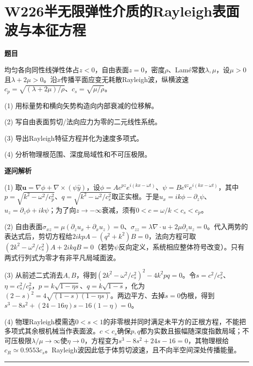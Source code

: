 \documentclass[UTF8,a4paper,11pt,oneside,openany]{ctexbook}
\begin{document}
\section*{W226\quad 半无限弹性介质的Rayleigh表面波与本征方程}
\textbf{题目}\par
均匀各向同性线弹性体占$z<0$，自由表面$z=0$，密度$\rho$、Lamé常数$\lambda,\mu$，设$\mu>0$且$\lambda+2\mu>0$。沿$x$传播平面应变无耗散Rayleigh波，纵横波速$c_p=\sqrt{(\lambda+2\mu)/\rho}$、$c_s=\sqrt{\mu/\rho}$。
\par\smallskip\noindent (1) 用标量势和横向矢势构造向内部衰减的位移解。
\par\smallskip\noindent (2) 写自由表面剪切/法向应力为零的二元线性系统。
\par\smallskip\noindent (3) 导出Rayleigh特征方程并化为速度多项式。
\par\smallskip\noindent (4) 分析物理根范围、深度局域性和不可压极限。
\par\medskip\textbf{逐问解析}\par
\par\smallskip\noindent (1) 取$\boldsymbol u=\nabla\phi+\nabla\times(\psi\hat y)$，设$\phi=Ae^{pz}e^{i(kx-\omega t)}$、$\psi=Be^{qz}e^{i(kx-\omega t)}$，其中$p=\sqrt{k^2-\omega^2/c_p^2}$、$q=\sqrt{k^2-\omega^2/c_s^2}$取正实根。于是$u_x=ik\phi-\partial_z\psi$、$u_z=\partial_z\phi+ik\psi$；为了向$z\to-\infty$衰减，须有$0<c=\omega/k<c_s<c_p$。
\par\smallskip\noindent (2) 自由表面$\sigma_{xz}=\mu(\partial_zu_x+\partial_xu_z)=0$、$\sigma_{zz}=\lambda\nabla\cdot u+2\mu\partial_zu_z=0$。代入两势的表达式后，剪切方程给$2ikpA-(q^2+k^2)B=0$，法向方程可取$(2k^2-\omega^2/c_s^2)A+2ikqB=0$（若势$\psi$反向定义，系统相应整体符号改变）。只有两式行列式为零才有非平凡局域面波。
\par\smallskip\noindent (3) 从前述二式消去$A,B$，得到$(2k^2-\omega^2/c_s^2)^2-4k^2pq=0$。令$s=c^2/c_s^2$、$\eta=c_s^2/c_p^2$，$p=k\sqrt{1-\eta s}$、$q=k\sqrt{1-s}$，化为$(2-s)^2=4\sqrt{(1-s)(1-\eta s)}$。两边平方、去掉$s=0$伪根，得到$s^3-8s^2+(24-16\eta)s-16(1-\eta)=0$。
\par\smallskip\noindent (4) 物理Rayleigh模需选$0<s<1$的非零根并同时满足未平方的正根方程，不能把多项式其余根机械当作表面波。$c<c_s$确保$p,q$都为实数且振幅随深度指数局域；不可压极限$\lambda/\mu\to\infty$使$\eta\to0$，方程变为$s^3-8s^2+24s-16=0$，其物理根给$c_R\simeq0.9553c_s$。Rayleigh波因此低于体剪切波速，且不向半空间深处传播能量。
\par\medskip\hrule\medskip
\end{document}

